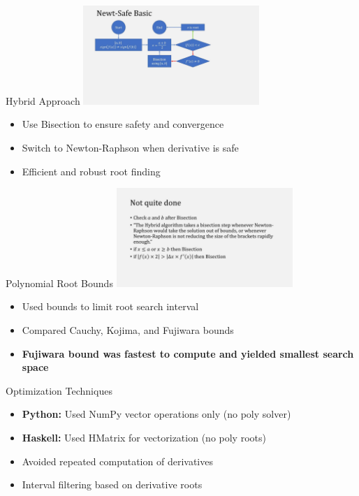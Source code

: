 \documentclass{beamer}
\begin{document}
\begin{frame}{Hybrid Approach}
\includegraphics[width=0.5\textwidth]{context_frame_02.jpg}
\begin{itemize}
    \item Use Bisection to ensure safety and convergence
    \item Switch to Newton-Raphson when derivative is safe
    \item Efficient and robust root finding
\end{itemize}
\end{frame}

\begin{frame}{Polynomial Root Bounds}
\includegraphics[width=0.5\textwidth]{context_frame_03.jpg}
\begin{itemize}
    \item Used bounds to limit root search interval
    \item Compared Cauchy, Kojima, and Fujiwara bounds
    \item \textbf{Fujiwara bound was fastest to compute and yielded smallest search space}
\end{itemize}
\end{frame}

\begin{frame}{Optimization Techniques}
\begin{itemize}
    \item \textbf{Python:} Used NumPy vector operations only (no poly solver)
    \item \textbf{Haskell:} Used HMatrix for vectorization (no poly roots)
    \item Avoided repeated computation of derivatives
    \item Interval filtering based on derivative roots
\end{itemize}
\end{frame}
\end{document}
